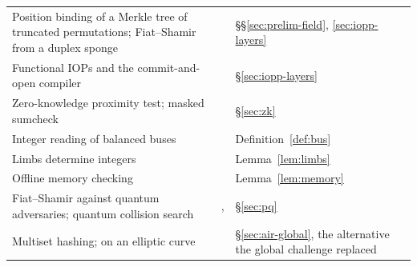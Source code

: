 \begin{table}[t]
\begin{tabular}{@{}>{\raggedright\arraybackslash}p{}>{\raggedright\arraybackslash}p{}>{\raggedright\arraybackslash}p{}@{}}
Position binding of a Merkle tree of truncated permutations; Fiat--Shamir from a duplex sponge & \citep{ckmw26,chiesa-orru25} & \S\S\ref{sec:prelim-field}, \ref{sec:iopp-layers} \\
Functional IOPs and the commit-and-open compiler & \citep{funky26} & \S\ref{sec:iopp-layers} \\
Zero-knowledge proximity test; masked sumcheck & \citep{cfw26,libra} & \S\ref{sec:zk} \\
Integer reading of balanced \LogUp{} buses & \citep[Cor.~3.6]{openvm-logup} & Definition~\ref{def:bus} \\
Limbs determine integers & \citep[Thm.~1]{cairo} & Lemma~\ref{lem:limbs} \\
Offline memory checking & \citep{blum1994,spice} & Lemma~\ref{lem:memory} \\
Fiat--Shamir against quantum adversaries; quantum collision search & \citep[Thm.~3]{cms19}, \citep{bht98,zhandry-collision} & \S\ref{sec:pq} \\
Multiset hashing; on an elliptic curve & \citep{multiset-hash,bellare-micciancio,ec-multiset-hash} & \S\ref{sec:air-global}, the alternative the global challenge replaced \\
\bottomrule
\end{tabular}
\end{table}
